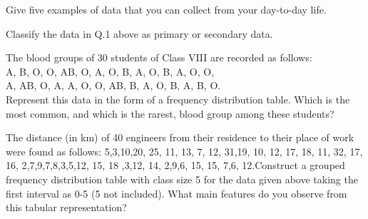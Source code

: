 
	\item Give five examples of data that you can collect from your day-to-day life.\\
	\item  Classify the data in Q.1 above as primary or secondary data.\\
	\item The blood groups of 30 students of Class VIII are recorded as follows:\\
A, B, O, O, AB, O, A, O, B, A, O, B, A, O, O,\\
A, AB, O, A, A, O, O, AB, B, A, O, B, A, B, O.\\
Represent this data in the form of a frequency distribution table. Which is the most common, and which is the rarest, blood group among these students?\\
\solution

\item
	  The distance (in km) of 40 engineers from their residence to their place of work were found as follows: 5,3,10,20, 25, 11, 13, 7, 12, 31,19, 10, 12, 17, 18, 11, 32, 17, 16, 2,7,9,7,8,3,5,12, 15, 18 ,3,12, 14, 2,9,6, 15, 15, 7,6, 12.Construct a grouped frequency distribution table with class size 5 for the data given above taking the first interval as 0-5 (5 not included).
What main features do you observe from this tabular representation?\\
\solution


